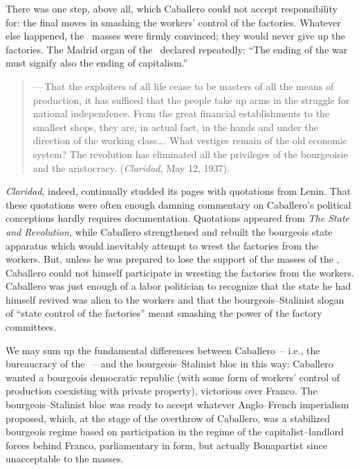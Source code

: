 There was one step, above all, which Caballero could not accept responsibility for: the final moves in smashing the workers’ control of the factories. Whatever else happened, the \UGT\ masses were firmly convinced; they would never give up the factories. The Madrid organ of the \UGT\ declared repeatedly: ``\kp The ending of the war must signify also the ending of capitalism.\kn\kn''
\nowidow

\begin{quotation}
  \noindent
  —\,That the exploiters of all life cease to be masters of all the means of production, it has sufficed that the people take up arms in the struggle for national independence. From the great financial establishments to the smallest shops, they are, in actual fact, in the hands and under the direction of the working class\dots. What vestiges remain of the old economic system? The revolution has eliminated all the privileges of the bourgeoisie and the aristocracy. (\emph{Claridad,} May 12, 1937).
\end{quotation}

\emph{Claridad}, indeed, continually studded its pages with quotations from Lenin. That these quotations were often enough damning commentary on Caballero’s political conceptions hardly requires documentation. Quotations appeared from \emph{The State and Revolution,} while Caballero strengthened and rebuilt the bourgeois state apparatus which would inevitably attempt to wrest the factories from the workers. But, unless he was prepared to lose the support of the masses of the \UGT\kn, Caballero could not himself participate in wresting the factories from the workers. Caballero was just enough of a labor politician to recognize that the state he had himself revived was alien to the workers and that the bourgeois--Stalinist slogan of ``state control of the factories'' meant smashing the power of the factory committees.

We may sum up the fundamental differences between Caballero~-- i.e., the bureaucracy of the \UGT~-- and the bourgeois--Stalinist bloc in this way: Caballero wanted a bourgeois democratic republic (with some form of workers’ control of production coexisting with private property), victorious over Franco. The bourgeois--Stalinist bloc was ready to accept whatever Anglo--French imperialism proposed, which, at the stage of the overthrow of Caballero, was a stabilized bourgeois regime based on participation in the regime of the cap\-i\-tal\-ist--landlord forces behind Franco, parliamentary in form, but actually Bonapartist since unacceptable to the masses.

